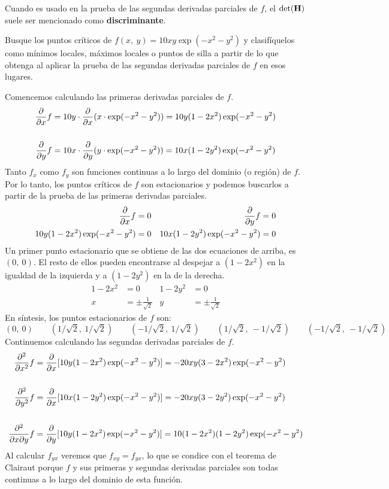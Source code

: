 \documentclass[12pt]{article}
\begin{document}
Cuando es usado en la prueba de las segundas derivadas parciales de $f$, el $\det(\mathbf{H})$ suele ser mencionado como \textbf{discriminante}.

\ejemplo Busque los puntos críticos de $f(x, \ y) = 10xy \exp(-x^{2} - y^{2})$ y clasifíquelos como mínimos locales, máximos locales o puntos de silla a partir de lo que obtenga al aplicar la prueba de las segundas derivadas parciales de $f$ en esos lugares.

\solucion Comencemos calculando las primeras derivadas parciales de $f$.
\begin{align*}
  \frac{\partial }{\partial x}{f} &= 10y \cdot \frac{\partial }{\partial x} (x \cdot \exp(-x^{2} - y^{2}))
                   = 10y (1 - 2x^{2}) \exp(-x^{2} - y^{2}) \\ \\
  \frac{\partial }{\partial y}{f} &= 10x \cdot \frac{\partial }{\partial y} (y \cdot \exp(-x^{2} - y^{2}))
                   = 10x (1 - 2y^{2}) \exp(-x^{2} - y^{2})
\end{align*}
Tanto $f_{x}$ como $f_{y}$ son funciones continuas a lo largo del dominio (o región) de $f$. Por lo tanto, los puntos críticos de $f$ son estacionarios y podemos buscarlos a partir de la prueba de las primeras derivadas parciales.
\begin{align*}
\frac{\partial }{\partial x}{f} &= 0 & \frac{\partial }{\partial y}{f} &= 0 \\
10y(1 - 2x^{2}) \exp(-x^{2} - y^{2}) &= 0 & 10x(1 - 2y^{2}) \exp(-x^{2} - y^{2}) &= 0
\end{align*}
Un primer punto estacionario que se obtiene de las dos ecuaciones de arriba, es $(0, \ 0)$. El resto de ellos pueden encontrarse al despejar a $(1 - 2x^{2})$ en la igualdad de la izquierda y a $(1 - 2y^{2})$ en la de la derecha.
\begin{align*}
1 - 2x^{2} &= 0 & 1 - 2y^{2} &= 0 \\
x &= \pm \frac{1}{\sqrt{2}} & y &= \pm \frac{1}{\sqrt{2}}
\end{align*}
En síntesis, los puntos estacionarios de $f$ son:
\[
  (0, \ 0) \qquad (1/\sqrt{2}, \ 1/\sqrt{2}) \qquad (-1/\sqrt{2}, \ 1/\sqrt{2}) \qquad
  (1/\sqrt{2}, \ -1/\sqrt{2}) \qquad (-1/\sqrt{2}, \ -1/\sqrt{2})
\]
Continuemos calculando las segundas derivadas parciales de $f$.
\begin{align*}
       \frac{\partial^{2} }{\partial x^{2}}f &= \frac{\partial }{\partial x}[10y (1 - 2x^{2}) \exp(-x^{2} - y^{2})]
                          = -20xy (3 - 2x^{2}) \exp(-x^{2} - y^{2}) \\ \\
       \frac{\partial^{2} }{\partial y^{2}}f &= \frac{\partial }{\partial x}[10x (1 - 2y^{2}) \exp(-x^{2} - y^{2})]
                          = -20xy (3 - 2y^{2}) \exp(-x^{2} - y^{2}) \\ \\
  \frac{\partial^{2} }{\partial x \partial y}f &= \frac{\partial }{\partial y}[10y (1 - 2x^{2}) \exp(-x^{2} - y^{2})]
                          = 10 (1 - 2x^{2}) (1 - 2y^{2}) \exp(-x^{2} - y^{2})
\end{align*}
Al calcular $f_{yx}$ veremos que $f_{xy} = f_{yx}$, lo que se condice con el teorema de Clairaut porque $f$ y sus primeras y segundas derivadas parciales son todas continuas a lo largo del dominio de esta función.
\end{document}
